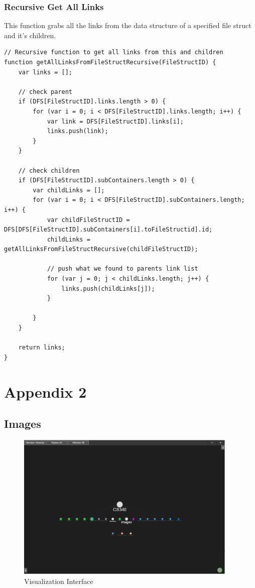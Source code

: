 \documentclass[letterpaper,10pt,titlepage,draftclsnofoot,onecolumn,onesided] {IEEEtran}
\begin{document}
	\pagebreak
	\subsubsection{Recursive Get All Links}
	This function grabs all the links from the data structure of a specified file struct and it's children.
	\begin{lstlisting}
// Recursive function to get all links from this and children
function getAllLinksFromFileStructRecursive(FileStructID) {
    var links = [];

    // check parent
    if (DFS[FileStructID].links.length > 0) {
        for (var i = 0; i < DFS[FileStructID].links.length; i++) {
            var link = DFS[FileStructID].links[i];
            links.push(link);
        }
    }

    // check children
    if (DFS[FileStructID].subContainers.length > 0) {
        var childLinks = [];
        for (var i = 0; i < DFS[FileStructID].subContainers.length; i++) {
            var childFileStructID = DFS[DFS[FileStructID].subContainers[i].toFileStructid].id;
            childLinks = getAllLinksFromFileStructRecursive(childFileStructID);

            // push what we found to parents link list
            for (var j = 0; j < childLinks.length; j++) {
                links.push(childLinks[j]);
            }

        }
    } 

    return links;
}
	\end{lstlisting}

\pagebreak
\section{Appendix 2}	
\subsection{Images}
	\begin{figure}[H]
		\includegraphics[width=400px]{PostalUI}
		\caption{Visualization Interface}  
	\end{figure}
	
\end{document}
